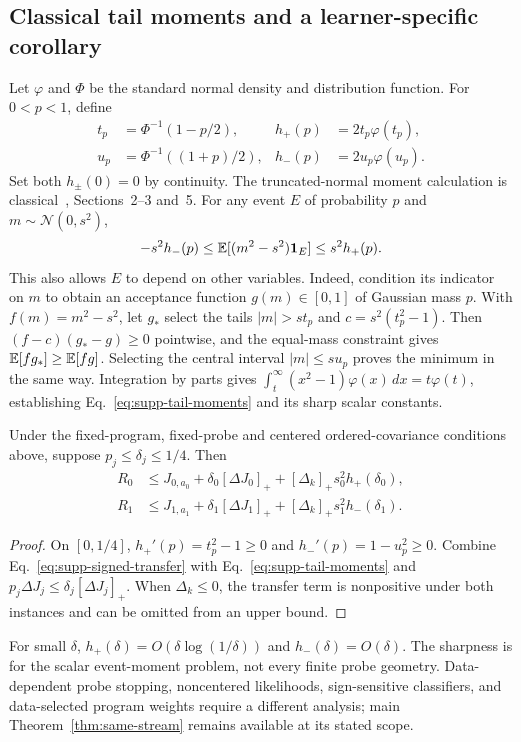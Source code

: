 \subsection{Classical tail moments and a learner-specific corollary}
Let $\varphi$ and $\Phi$ be the standard normal density and distribution function.
For $0<p<1$, define
\begin{align*}
t_p&=\Phi^{-1}(1-p/2),& h_+(p)&=2t_p\varphi(t_p),\\
u_p&=\Phi^{-1}((1+p)/2),& h_-(p)&=2u_p\varphi(u_p).
\end{align*}
Set both $h_\pm(0)=0$ by continuity.
The truncated-normal moment calculation is classical~, Sections~2--3 and~5.
For any event $E$ of probability $p$ and $m\sim\mathcal N(0,s^2)$,
\begin{equation}
-s^2h_-(p)\le\mathbb E[(m^2-s^2)\mathbf1_E]\le s^2h_+(p).
\label{eq:supp-tail-moments}
\end{equation}
This also allows $E$ to depend on other variables.
Indeed, condition its indicator on $m$ to obtain an acceptance function $g(m)\in[0,1]$ of Gaussian mass $p$.
With $f(m)=m^2-s^2$, let $g_*$ select the tails $|m|>st_p$ and $c=s^2(t_p^2-1)$.
Then $(f-c)(g_*-g)\ge0$ pointwise, and the equal-mass constraint gives $\mathbb E[fg_*]\ge\mathbb E[fg]$.
Selecting the central interval $|m|\le su_p$ proves the minimum in the same way.
Integration by parts gives $\int_t^\infty(x^2-1)\varphi(x)\,dx=t\varphi(t)$, establishing Eq.~\eqref{eq:supp-tail-moments} and its sharp scalar constants.

\begin{proposition}
Under the fixed-program, fixed-probe and centered ordered-covariance conditions above, suppose $p_j\le\delta_j\le1/4$.
Then
\begin{align}
R_0&\le J_{0,a_0}+\delta_0[\Delta J_0]_+
+[\Delta_k]_+s_0^2h_+(\delta_0),\\
R_1&\le J_{1,a_1}+\delta_1[\Delta J_1]_+
+[\Delta_k]_+s_1^2h_-(\delta_1).
\label{eq:supp-signed-upper}
\end{align}
\label{prop:supp-signed-risk}
\end{proposition}
\begin{proof}
On $[0,1/4]$, $h_+'(p)=t_p^2-1\ge0$ and $h_-'(p)=1-u_p^2\ge0$.
Combine Eq.~\eqref{eq:supp-signed-transfer} with Eq.~\eqref{eq:supp-tail-moments} and $p_j\Delta J_j\le\delta_j[\Delta J_j]_+$.
When $\Delta_k\le0$, the transfer term is nonpositive under both instances and can be omitted from an upper bound.
\end{proof}
For small $\delta$, $h_+(\delta)=O(\delta\log(1/\delta))$ and $h_-(\delta)=O(\delta)$.
The sharpness is for the scalar event-moment problem, not every finite probe geometry.
Data-dependent probe stopping, noncentered likelihoods, sign-sensitive classifiers, and data-selected program weights require a different analysis; main Theorem~\ref{thm:same-stream} remains available at its stated scope.

